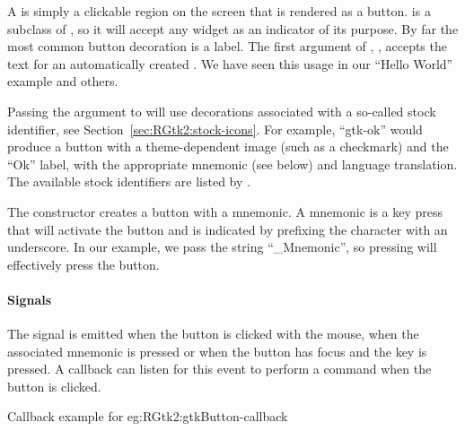 A  is simply a clickable region on the screen that is
rendered as a button.  is a subclass of
, so it will accept any widget as an indicator of its
purpose. By far the most common button decoration is a label. The
first argument of ,
, accepts the text for an automatically
created . We have seen this usage in our ``Hello
World'' example and others.

Passing the  argument to
 will use decorations associated with a so-called
stock identifier, see Section~\ref{sec:RGtk2:stock-icons}. For
example, ``gtk-ok'' would produce a button with a theme-dependent
image (such as a checkmark) and the ``Ok'' label, with the appropriate
mnemonic (see below) and language translation.  The available stock
identifiers are listed by .

The  constructor creates a
button with a mnemonic. A mnemonic is a key press that will activate
the button and is indicated by prefixing the character with an
underscore. In our example, we pass the string ``\_Mnemonic'', so
pressing  will effectively press the button.

\paragraph{Signals}

The  signal is emitted when the button is clicked with
the mouse, when the associated mnemonic is pressed or when the button
has focus and the  key is pressed. A callback can listen
for this event to perform a command when the button is clicked.

\begin{example}{Callback example for
    }{eg:RGtk2:gtkButton-callback}

\begin{Schunk}
\end{Schunk}
\end{example}

